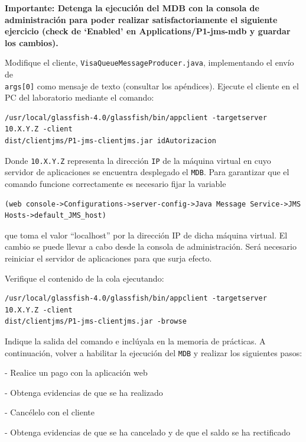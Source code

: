 \documentclass[a4paper, 10pt]{article}
\begin{document}
\begin{mdframed}
 \textbf{Importante: Detenga la ejecución del MDB con la consola de administración para poder
realizar satisfactoriamente el siguiente ejercicio (check de ‘Enabled’ en Applications/P1-jms-mdb y
guardar los cambios).}

\vspace{3mm}
Modifique el cliente, \texttt{VisaQueueMessageProducer.java}, implementando el envío de\\ \texttt{args[0]} como mensaje
de texto (consultar los apéndices). Ejecute el cliente en el PC del laboratorio mediante el comando:

\begin{lstlisting}
/usr/local/glassfish-4.0/glassfish/bin/appclient -targetserver 10.X.Y.Z -client
dist/clientjms/P1-jms-clientjms.jar idAutorizacion
\end{lstlisting}

Donde \texttt{10.X.Y.Z} representa la dirección \texttt{IP} de la máquina virtual en cuyo servidor de aplicaciones se
encuentra desplegado el \texttt{MDB}. Para garantizar que el comando funcione correctamente es necesario fijar
la variable

\begin{lstlisting}
(web console->Configurations->server-config->Java Message Service->JMS Hosts->default_JMS_host)
\end{lstlisting}

\noindent que toma el valor “localhost” por la dirección IP de dicha máquina virtual. El cambio se puede llevar a cabo
desde la consola de administración. Será necesario reiniciar el servidor de aplicaciones para que surja
efecto.

\noindent Verifique el contenido de la cola ejecutando:
\begin{lstlisting}
/usr/local/glassfish-4.0/glassfish/bin/appclient -targetserver 10.X.Y.Z -client
dist/clientjms/P1-jms-clientjms.jar -browse
\end{lstlisting}

\noindent Indique la salida del comando e inclúyala en la memoria de prácticas.
A continuación, volver a habilitar la ejecución del \texttt{MDB} y realizar los siguientes pasos:

- Realice un pago con la aplicación web

- Obtenga evidencias de que se ha realizado

- Cancélelo con el cliente

- Obtenga evidencias de que se ha cancelado y de que el saldo se ha rectificado

\end{mdframed}
	
\end{document}
